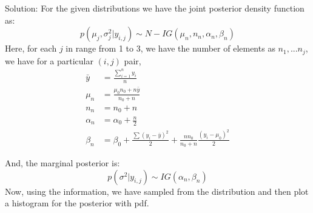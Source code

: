 \documentclass[]{article}
\begin{document}
Solution: For the given distributions we have the joint posterior
density function as:
\[p(\mu_j, \sigma_j^2 | y_{i,j}) \sim N-IG(\mu_n, n_n, \alpha_n, \beta_n)\]
Here, for each \(j\) in range from 1 to 3, we have the number of
elements as \(n_1, ... n_j\), we have for a particular \((i, j)\) pair,
\[
\begin{align*}
    \bar{y} &= \frac{\sum_{i=1}^{n} y_i}{n} \\    
  \mu_n &= \frac{\mu_0 n_0 + n \bar{y}}{n_0 + n} \\
  n_n &= n_0 + n \\
  \alpha_n &= \alpha_0 + \frac{n}{{2}} \\
  \beta_n &= \beta_0 + \frac{\sum(y_i - \bar{y})^2}{2} + \frac{n n_0}{n_0 + n} \frac{(y_i - \mu_0)^2}{2}
\end{align*}
\]

And, the marginal posterior is:
\[p(\sigma^2|y_{i,j}) \sim IG(\alpha_n, \beta_n)\] Now, using the
information, we have sampled from the distribution and then plot a
histogram for the posterior with pdf.
\end{document}

